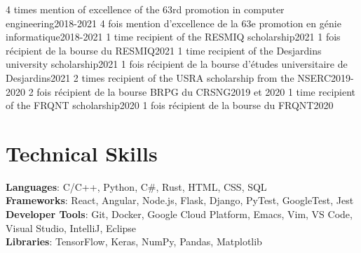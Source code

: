 \documentclass[letterpaper,11pt]{resume}
\begin{document}
    \resumeSubHeadingListStart
        \resumeDatedItemEnFr
            {4 times mention of excellence of the 63rd promotion in computer engineering}{2018-2021}
            {4 fois mention d’excellence de la 63e promotion en génie informatique}{2018-2021}
        \resumeDatedItemEnFr
            {1 time recipient of the RESMIQ scholarship}{2021}
            {1 fois récipient de la bourse du RESMIQ}{2021}
        \resumeDatedItemEnFr
            {1 time recipient of the Desjardins university scholarship}{2021}
            {1 fois récipient de la bourse d’études universitaire de Desjardins}{2021}
        \resumeDatedItemEnFr
            {2 times recipient of the USRA scholarship from the NSERC}{2019-2020}
            {2 fois récipient de la bourse BRPG du CRSNG}{2019 et 2020}
        \resumeDatedItemEnFr
            {1 time recipient of the FRQNT scholarship}{2020}
            {1 fois récipient de la bourse du FRQNT}{2020}
    \resumeSubHeadingListEnd

%
\section{Technical Skills}
 \begin{itemize}[leftmargin=0.15in, label={}]
    \small{\item{
     \textbf{Languages}{: C/C++, Python, C\#, Rust, HTML, CSS, SQL} \\
     \textbf{Frameworks}{: React, Angular, Node.js, Flask, Django, PyTest, GoogleTest, Jest} \\
     \textbf{Developer Tools}{: Git, Docker, Google Cloud Platform, Emacs, Vim, VS Code, Visual Studio, IntelliJ, Eclipse} \\
     \textbf{Libraries}{: TensorFlow, Keras, NumPy, Pandas, Matplotlib}
    }}
 \end{itemize}


\end{document}

